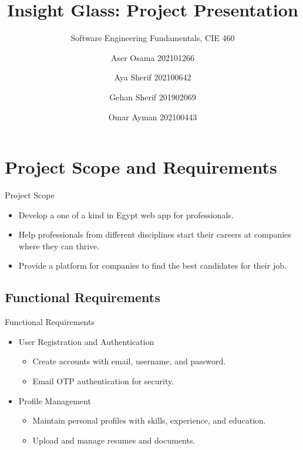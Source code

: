 \documentclass{beamer}
\title{Insight Glass: Project Presentation}
\subtitle{Software Engineering  Fundamentals, CIE 460}
\author{Aser Osama 202101266 \and Aya Sherif 202100642 \\ \and Gehan Sherif 201902069 \and Omar Ayman 202100443}
\begin{document}
\frame{\titlepage}

\section{Project Scope and Requirements}
\begin{frame}{Project Scope}
    \begin{itemize}
        \item Develop a one of a kind in Egypt web app for professionals.
        \item Help professionals from different disciplines start their careers at companies
        where they can thrive.
        \item Provide a platform for companies to find the best candidates for their job. 
    \end{itemize}
\end{frame}


\subsection{Functional Requirements}
\begin{frame}{Functional Requirements}
    \begin{itemize}
        \item User Registration and Authentication
        \begin{itemize}
            \item Create accounts with email, username, and password.
            \item Email OTP authentication for security.
        \end{itemize}
        \item Profile Management
        \begin{itemize}
            \item Maintain personal profiles with skills, experience, and education.
            \item Upload and manage resumes and documents.
        \end{itemize}
    \end{itemize}
\end{frame}
\end{document}
